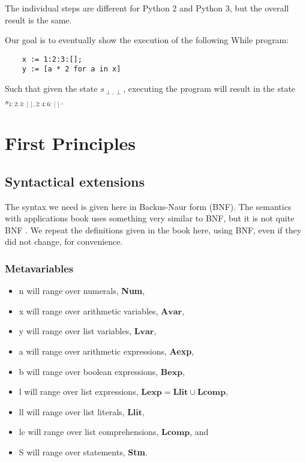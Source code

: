 \documentclass[12pt]{article}
\newcommand{\metavar}[1]{\textlangle#1\textrangle}
\newcommand{\Avar}{\mathbf{Avar}}
\newcommand{\Lvar}{\mathbf{Lvar}}
\newcommand{\Bexp}{\mathbf{Bexp}}
\newcommand{\Lexp}{\mathbf{Lexp}}
\newcommand{\Llit}{\mathbf{Llit}}
\newcommand{\Lcomp}{\mathbf{Lcomp}}
\begin{document}
The individual steps are different for Python 2 and Python 3, but the overall result is the same.

Our goal is to eventually show the execution of the following While program:

\begin{lstlisting}
    x := 1:2:3:[];
    y := [a * 2 for a in x]
\end{lstlisting}

Such that given the state $s_{\perp, \perp}$, executing the program will result in the state $s_{1:2:3:[], 2:4:6:[]}$.

\section{First Principles}

\subsection{Syntactical extensions}

The syntax we need is given here in Backus-Naur form (BNF). The semantics with applications book uses something very similar to BNF, but it is not quite BNF \cite[section 1.2]{wiley}. We repeat the definitions given in the book here, using BNF, even if they did not change, for convenience.

\subsubsection{Metavariables}

\begin{itemize}
    \item \metavar{n} will range over numerals, \textbf{Num},
    \item \metavar{x} will range over arithmetic variables, $\Avar$,
    \item \metavar{y} will range over list variables, $\Lvar$,
    \item \metavar{a} will range over arithmetic expressions, \textbf{Aexp},
    \item \metavar{b} will range over boolean expressions, $\Bexp$,
    \item \metavar{l} will range over list expressions, $\Lexp = \Llit \cup \Lcomp$,
    \item \metavar{ll} will range over list literals, $\Llit$,
    \item \metavar{lc} will range over list comprehensions, $\Lcomp$, and
    \item \metavar{S} will range over statements, \textbf{Stm}.
\end{itemize}
\end{document}
